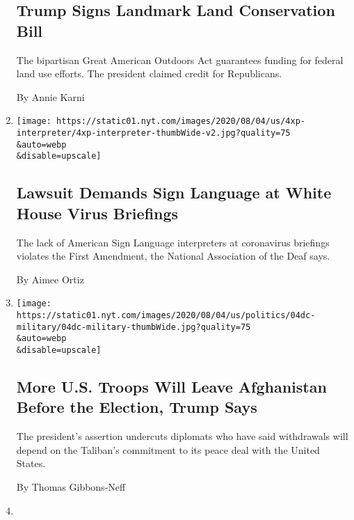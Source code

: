 \begin{enumerate}
{  \subsection{Trump Signs Landmark Land Conservation
  Bill}\label{trump-signs-landmark-land-conservation-bill}}

  The bipartisan Great American Outdoors Act guarantees funding for
  federal land use efforts. The president claimed credit for
  Republicans.

  By Annie Karni
\item
  \href{/2020/08/04/us/politics/asl-interpreter-lawsuit-coronavirus-trump.html}{}

  \texttt{[image: https://static01.nyt.com/images/2020/08/04/us/4xp-interpreter/4xp-interpreter-thumbWide-v2.jpg?quality=75\\\&auto=webp\\\&disable=upscale]}

  \hypertarget{lawsuit-demands-sign-language-at-white-house-virus-briefings}{%
  \subsection{Lawsuit Demands Sign Language at White House Virus
  Briefings}\label{lawsuit-demands-sign-language-at-white-house-virus-briefings}}

  The lack of American Sign Language interpreters at coronavirus
  briefings violates the First Amendment, the National Association of
  the Deaf says.

  By Aimee Ortiz
\item
  \href{/2020/08/04/world/asia/us-troops-afghanistan.html}{}

  \texttt{[image: https://static01.nyt.com/images/2020/08/04/us/politics/04dc-military/04dc-military-thumbWide.jpg?quality=75\\\&auto=webp\\\&disable=upscale]}

  \hypertarget{more-us-troops-will-leave-afghanistan-before-the-election-trump-says}{%
  \subsection{More U.S. Troops Will Leave Afghanistan Before the
  Election, Trump
  Says}\label{more-us-troops-will-leave-afghanistan-before-the-election-trump-says}}

  The president's assertion undercuts diplomats who have said
  withdrawals will depend on the Taliban's commitment to its peace deal
  with the United States.

  By Thomas Gibbons-Neff
\item
  \href{/2020/08/04/us/politics/trump-immigration-wealth-test.html}{}


\end{enumerate}
